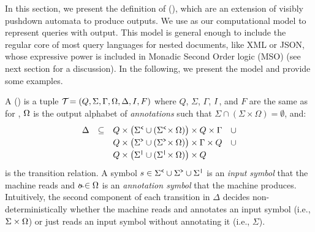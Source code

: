 


In this section, we present the definition of \emph{\vpannnames} 
(\vpann),
which are an extension of visibly pushdown automata to produce outputs. We use \vpann as our computational model to represent queries with output. This model is general enough to include the regular core of most query languages for nested documents, like XML or JSON, whose expressive power is included in Monadic Second Order logic (MSO) (see next section for a discussion). In the following, we present the \vpann model and provide some examples.

A \emph{\vpannname} (\vpann) is a tuple
$
\mathcal{T}\! = (Q, \Sigma, \Gamma, \Omega, \Delta, I, F)
$ where $Q$, $\Sigma$, $\Gamma$, $I$, and $F$ are the same as for \vpa, $\Omega$ is the output alphabet of \emph{annotations} such that $\Sigma \cap (\Sigma \times \Omega) = \emptyset$, and:
$$
\renewcommand{\arraystretch}{1.2}
\begin{array}{rcl}
	\Delta & \subseteq & 
	Q \times \big(\opS \cup (\opS \!\times \oalph)\big) \times Q \times \Gamma \ \ \ \cup \\
	& & Q \times \big(\clS  \cup  (\clS \!\times \oalph)\big) \times \Gamma \times Q \ \ \ \cup  \\
	& & Q \times \big(\noS  \cup  (\noS \!\times \oalph)\big) \times Q
\end{array}
$$
\noindent is the transition relation. A symbol $s \in \Sigma^{\texttt{<}} \cup \Sigma^{\texttt{>}} \cup \Sigma^{\texttt{|}}$ is an \emph{input symbol} that the machine reads and $\oout \in \oalph$ is an \emph{annotation symbol} that the machine produces. Intuitively, the second component of each transition in $\Delta$ decides non-deterministically whether the machine reads and annotates an input symbol (i.e., $\Sigma\times\Omega$) or just reads an input symbol without annotating it (i.e., $\Sigma$).

